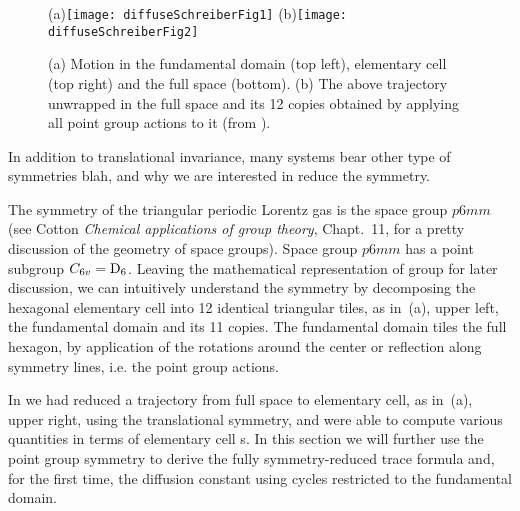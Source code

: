 


\begin{figure}[htbp]
  \begin{center}
    (a)\;\texttt{[image: diffuseSchreiberFig1]}
    (b)\texttt{[image: diffuseSchreiberFig2]}
  \end{center}
  \caption[]{\label{fig-schrieberFig12}
  (a) Motion in the fundamental domain (top left), elementary cell (top
      right) and the full space (bottom).
  (b) The above trajectory unwrapped in the full space and its 12 copies
    obtained by applying all point group  actions to it (from
    ).
  }
\end{figure}

In addition to translational invariance, many systems bear other type of
symmetries blah, and why we are interested in reduce the symmetry.

The symmetry of the triangular periodic Lorentz gas is the space group $p6mm$ (see Cotton
{\em Chemical applications of group theory},  Chapt.~11, for a pretty
discussion of the geometry of space groups).
Space group $p6mm$ has a point subgroup $C_{6v}=\textrm{D}_{6}$. Leaving the mathematical
representation of group for later discussion, we can intuitively
understand the symmetry by decomposing the hexagonal elementary cell into
12 identical triangular tiles, as in \,(a), upper
left, the fundamental domain and its 11 copies. The fundamental domain tiles
the full hexagon, by application of the  rotations around the center or
reflection along symmetry lines, i.e. the point group actions.

In  we had reduced a trajectory from full space to
elementary cell, as in \,(a), upper right, using the
translational symmetry, and were able to compute various quantities in terms
of elementary cell \po s. In this section we will further use the
point group symmetry to derive the fully symmetry-reduced trace formula
and, for the first time, the diffusion constant using cycles restricted
to the fundamental domain.


